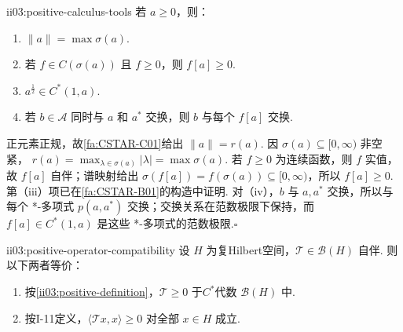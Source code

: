 \begin{FAProposition}[C][正元素的局部函数工具]{ii03:positive-calculus-tools}
若 \(\displaystyle a\geqslant0\)，则：
\begin{enumerate}[label=\textnormal{(\roman*)}]
\item \(\displaystyle\|a\|=\max\sigma(a)\).
\item 若 \(\displaystyle f\in C(\sigma(a))\) 且 \(\displaystyle f\geqslant0\)，则 \(\displaystyle f[a]\geqslant0\).
\item \(\displaystyle a^{\frac{1}{2}}\in C^*(1,a)\).
\item 若 \(\displaystyle b\in\mathcal A\) 同时与 \(\displaystyle a\) 和 \(\displaystyle a^*\) 交换，则 \(\displaystyle b\) 与每个 \(\displaystyle f[a]\) 交换.
\end{enumerate}
\end{FAProposition}

\begin{FAProof}
正元素正规，故\autoref{fa:CSTAR-C01}给出 \(\displaystyle\|a\|=r(a)\). 因 \(\displaystyle\sigma(a)\subseteq[0,\infty)\) 非空紧，
\(\displaystyle r(a)=\max_{\lambda\in\sigma(a)}|\lambda|=\max\sigma(a).\)
若 \(\displaystyle f\geqslant0\) 为连续函数，则 \(\displaystyle f\) 实值，故 \(\displaystyle f[a]\) 自伴；谱映射给出 \(\displaystyle\sigma(f[a])=f(\sigma(a))\subseteq[0,\infty)\)，所以 \(\displaystyle f[a]\geqslant0\). 第（iii）项已在\autoref{fa:CSTAR-B01}的构造中证明. 对（iv），\(\displaystyle b\) 与 \(\displaystyle a,a^*\) 交换，所以与每个 *-多项式 \(\displaystyle p(a,a^*)\) 交换；交换关系在范数极限下保持，而 \(\displaystyle f[a]\in C^*(1,a)\) 是这些 *-多项式的范数极限.\hfill\(\square\)
\end{FAProof}

\begin{FATheorem}{ii03:positive-operator-compatibility}
设 \(\displaystyle H\) 为复Hilbert空间，\(\displaystyle\mathcal T\in\mathcal B(H)\) 自伴. 则以下两者等价：
\begin{enumerate}[label=\textnormal{(\roman*)}]
\item 按\autoref{ii03:positive-definition}，\(\displaystyle\mathcal T\geqslant0\) 于\(\displaystyle C^*\)代数 \(\displaystyle\mathcal B(H)\) 中.
\item 按I-11定义，\(\displaystyle\langle\mathcal T x,x\rangle\geqslant0\) 对全部 \(\displaystyle x\in H\) 成立.
\end{enumerate}
\end{FATheorem}

